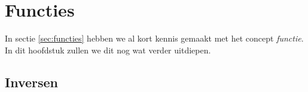 \chapter{Functies}\label{app:functies}
In sectie \ref{sec:functies} hebben we al kort kennis gemaakt met het concept \textit{functie}. In dit hoofdstuk zullen we dit nog wat verder uitdiepen.

\section{Inversen}
%
%
%
%
